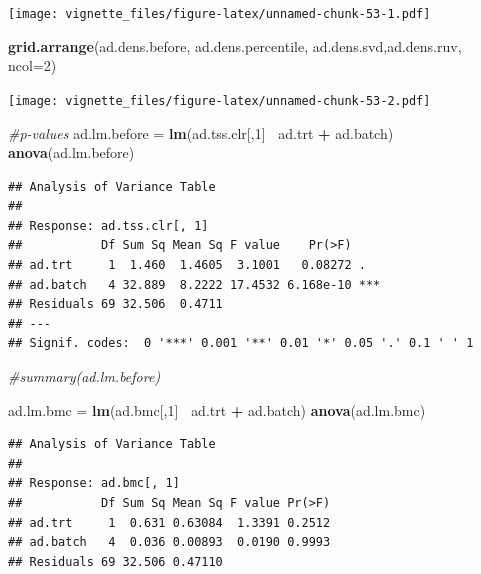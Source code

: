 \documentclass[]{book}
\newenvironment{Shaded}{\begin{snugshade}}{\end{snugshade}}
\newcommand{\KeywordTok}[1]{\textcolor[rgb]{0.13,0.29,0.53}{\textbf{#1}}}
\newcommand{\DataTypeTok}[1]{\textcolor[rgb]{0.13,0.29,0.53}{#1}}
\newcommand{\DecValTok}[1]{\textcolor[rgb]{0.00,0.00,0.81}{#1}}
\newcommand{\StringTok}[1]{\textcolor[rgb]{0.31,0.60,0.02}{#1}}
\newcommand{\CommentTok}[1]{\textcolor[rgb]{0.56,0.35,0.01}{\textit{#1}}}
\newcommand{\OperatorTok}[1]{\textcolor[rgb]{0.81,0.36,0.00}{\textbf{#1}}}
\newcommand{\NormalTok}[1]{#1}
\begin{document}
\texttt{[image: vignette\_files/figure-latex/unnamed-chunk-53-1.pdf]}

\begin{Shaded}
\begin{Highlighting}[]
\KeywordTok{grid.arrange}\NormalTok{(ad.dens.before, ad.dens.percentile, ad.dens.svd,ad.dens.ruv, }\DataTypeTok{ncol=}\DecValTok{2}\NormalTok{)}
\end{Highlighting}
\end{Shaded}

\texttt{[image: vignette\_files/figure-latex/unnamed-chunk-53-2.pdf]}

\begin{Shaded}
\begin{Highlighting}[]
\CommentTok{#p-values}
\NormalTok{ad.lm.before =}\StringTok{ }\KeywordTok{lm}\NormalTok{(ad.tss.clr[,}\DecValTok{1}\NormalTok{]}\OperatorTok{~}\StringTok{ }\NormalTok{ad.trt }\OperatorTok{+}\StringTok{ }\NormalTok{ad.batch)}
\KeywordTok{anova}\NormalTok{(ad.lm.before)}
\end{Highlighting}
\end{Shaded}

\begin{verbatim}
## Analysis of Variance Table
## 
## Response: ad.tss.clr[, 1]
##           Df Sum Sq Mean Sq F value    Pr(>F)    
## ad.trt     1  1.460  1.4605  3.1001   0.08272 .  
## ad.batch   4 32.889  8.2222 17.4532 6.168e-10 ***
## Residuals 69 32.506  0.4711                      
## ---
## Signif. codes:  0 '***' 0.001 '**' 0.01 '*' 0.05 '.' 0.1 ' ' 1
\end{verbatim}

\begin{Shaded}
\begin{Highlighting}[]
\CommentTok{#summary(ad.lm.before)}

\NormalTok{ad.lm.bmc =}\StringTok{ }\KeywordTok{lm}\NormalTok{(ad.bmc[,}\DecValTok{1}\NormalTok{]}\OperatorTok{~}\StringTok{ }\NormalTok{ad.trt }\OperatorTok{+}\StringTok{ }\NormalTok{ad.batch)}
\KeywordTok{anova}\NormalTok{(ad.lm.bmc)}
\end{Highlighting}
\end{Shaded}

\begin{verbatim}
## Analysis of Variance Table
## 
## Response: ad.bmc[, 1]
##           Df Sum Sq Mean Sq F value Pr(>F)
## ad.trt     1  0.631 0.63084  1.3391 0.2512
## ad.batch   4  0.036 0.00893  0.0190 0.9993
## Residuals 69 32.506 0.47110
\end{verbatim}
\end{document}
